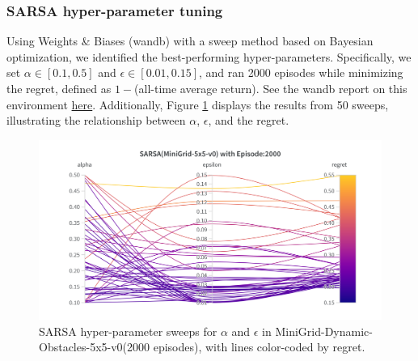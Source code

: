 \documentclass[11pt, a4]{article}
\begin{document}
			\subsubsection{SARSA hyper-parameter tuning}
			Using Weights \& Biases (wandb) with a sweep method based on Bayesian optimization, we identified the best-performing hyper-parameters. Specifically, we set $\alpha \in [0.1, 0.5]$ and $\epsilon \in [0.01, 0.15]$, and ran 2000 episodes while minimizing the regret, defined as \(1 -\)(all-time average return). See the wandb report on this environment \href{https://api.wandb.ai/links/ee24e009-iitm/axvqh3jk}{here}. Additionally, Figure \ref{fig:sarsaminigridworld-regret} displays the results from 50 sweeps, illustrating the relationship between $\alpha$, $\epsilon$, and the regret.
			\begin{figure}[H]
				\centering
				\includegraphics[width=1\linewidth]{sarsa-hyp-tuning-minigridworld.png}
				\caption{SARSA hyper-parameter sweeps for $\alpha$ and $\epsilon$ in MiniGrid-Dynamic-Obstacles-5x5-v0(2000 episodes), with lines color-coded by regret.}
				\label{fig:sarsaminigridworld-regret}
			\end{figure}
\end{document}
